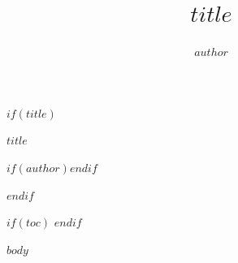 \documentclass[$if(fontsize)$$fontsize$,$endif$openright,twoside]{book}
\title{$title$}
\author{$author$}
\begin{document}
$if(title)$
\thispagestyle{empty}
\begin{titlepage}
  \vspace*{\fill}
  \begin{center}
    {\Huge\bfseries $title$\par}
    $if(author)$\vspace{1.2em}{\Large $author$\par}$endif$
  \end{center}
  \vspace*{\fill}
\end{titlepage}
\clearpage
$endif$

$if(toc)$
\frontmatter
\pagestyle{plain}
\tableofcontents
\clearpage
$endif$

\mainmatter

$body$
\end{document}
